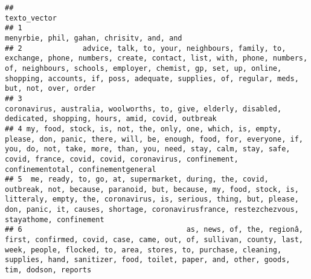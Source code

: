 \documentclass[
]{article}
\newenvironment{Shaded}{\begin{snugshade}}{\end{snugshade}}
\newcommand{\CommentTok}[1]{\textcolor[rgb]{0.56,0.35,0.01}{\textit{#1}}}
\newcommand{\DecValTok}[1]{\textcolor[rgb]{0.00,0.00,0.81}{#1}}
\newcommand{\NormalTok}[1]{#1}
\newcommand{\OperatorTok}[1]{\textcolor[rgb]{0.81,0.36,0.00}{\textbf{#1}}}
\begin{document}
\begin{verbatim}
##                                                                                                                                                                                                                                                                                      texto_vector
## 1                                                                                                                                                                                                                                                       menyrbie, phil, gahan, chrisitv, and, and
## 2              advice, talk, to, your, neighbours, family, to, exchange, phone, numbers, create, contact, list, with, phone, numbers, of, neighbours, schools, employer, chemist, gp, set, up, online, shopping, accounts, if, poss, adequate, supplies, of, regular, meds, but, not, over, order
## 3                                                                                                                                                                              coronavirus, australia, woolworths, to, give, elderly, disabled, dedicated, shopping, hours, amid, covid, outbreak
## 4 my, food, stock, is, not, the, only, one, which, is, empty, please, don, panic, there, will, be, enough, food, for, everyone, if, you, do, not, take, more, than, you, need, stay, calm, stay, safe, covid, france, covid, covid, coronavirus, confinement, confinementotal, confinementgeneral
## 5  me, ready, to, go, at, supermarket, during, the, covid, outbreak, not, because, paranoid, but, because, my, food, stock, is, litteraly, empty, the, coronavirus, is, serious, thing, but, please, don, panic, it, causes, shortage, coronavirusfrance, restezchezvous, stayathome, confinement
## 6                                      as, news, of, the, regionâ, first, confirmed, covid, case, came, out, of, sullivan, county, last, week, people, flocked, to, area, stores, to, purchase, cleaning, supplies, hand, sanitizer, food, toilet, paper, and, other, goods, tim, dodson, reports
\end{verbatim}

\begin{Shaded}
\end{Shaded}
\end{document}
